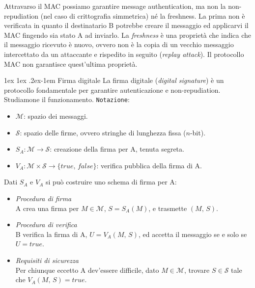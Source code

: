 \documentclass[a4paper, 11pt, twoside, openright, fleqn]{report}
\makeatletter
\renewcommand{\paragraph}{%
	\@startsection{paragraph}{4}%
	{\z@}{1ex \@plus 1ex \@minus .2ex}{-1em}%
	{\normalfont\normalsize\bfseries}%
}
\makeatother
\begin{document}
Attravarso il MAC possiamo garantire message authentication, ma non la non-repudiation (nel caso di crittografia simmetrica) né la freshness. La prima non è verificata in quanto il destinatario B potrebbe creare il messaggio ed applicarvi il MAC fingendo sia stato A ad inviarlo. La \emph{freshness} è una proprietà che indica che il messaggio ricevuto è nuovo, ovvero non è la copia di un vecchio messaggio intercettato da un attaccante e rispedito in seguito (\emph{replay attack}). Il protocollo MAC non garantisce quest'ultima proprietà.

\paragraph{Firma digitale}
La firma digitale (\emph{digital signature}) è un protocollo fondamentale per garantire autenticazione e non-repudiation. Studiamone il funzionamento.
\texttt{Notazione}:
\begin{itemize}
	\item $\mathcal{M}$: spazio dei messaggi.
	\item $\mathcal{S}$: spazio delle firme, ovvero stringhe di lunghezza fissa ($n$-bit).
	\item $S_A\!:\mathcal{M}\rightarrow \mathcal{S}$: creazione della firma per A, tenuta segreta.
	\item $V_A\!: \mathcal{M}\times \mathcal{S}\rightarrow\{true,\,false\}$: verifica pubblica della firma di A.
\end{itemize}
Dati $S_A$ e $V_A$ si può costruire uno schema di firma per A:
\begin{itemize}
	\item \emph{Procedura di firma}\\
	A crea una firma per $M\in\mathcal{M}$, $S=S_A(M)$, e trasmette $(M,\,S)$.
	\item \emph{Procedura di verifica}\\
	B verifica la firma di A, $U=V_A(M,\,S)$, ed accetta il messaggio se e solo se $U=true$.
	\item \emph{Requisiti di sicurezza}\\
	Per chiunque eccetto A dev'essere difficile, dato $M\in\mathcal{M}$, trovare $S\in\mathcal{S}$ tale che $V_A(M,\,S)=true$.
\end{itemize}
\end{document}
